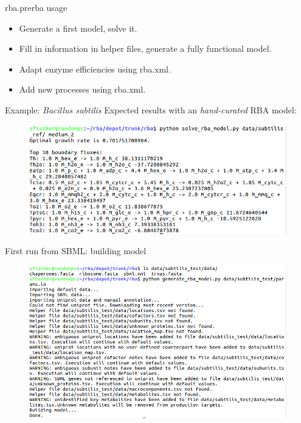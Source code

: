 \documentclass{beamer}
\begin{document}
\begin{frame}{rba.prerba usage}
  \begin{itemize}
    \item Generate a first model, solve it.
    \item Fill in information in helper files, generate a fully functional
    model.
    \item Adapt enzyme efficiencies using rba.xml.
    \item Add new processes using rba.xml.
  \end{itemize}
\end{frame}

\begin{frame}{Example: \textit{Bacillus subtilis}}
  Expected results with an \emph{hand-curated} RBA model:
  \begin{figure}
    \centering
    \includegraphics[width=\linewidth]{subtilis_ref}
  \end{figure}
\end{frame}

\begin{frame}{First run from SBML: building model}
  \begin{figure}
    \centering
    \includegraphics[width=\linewidth]{first_run}
  \end{figure}
\end{frame}
\end{document}
